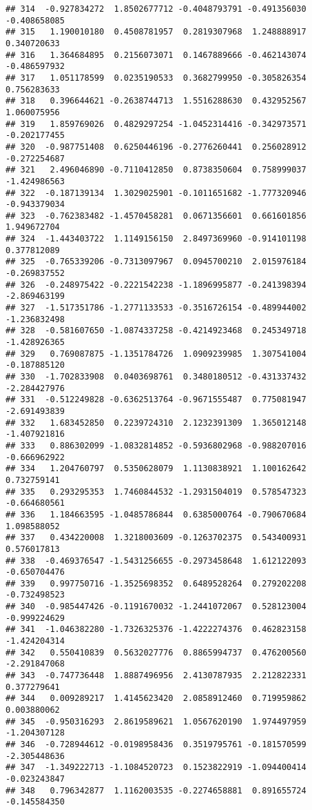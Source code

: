 \documentclass[
]{article}
\begin{document}
\begin{verbatim}
## 314  -0.927834272  1.8502677712 -0.4048793791 -0.491356030 -0.408658085
## 315   1.190010180  0.4508781957  0.2819307968  1.248888917  0.340720633
## 316   1.364684895  0.2156073071  0.1467889666 -0.462143074 -0.486597932
## 317   1.051178599  0.0235190533  0.3682799950 -0.305826354  0.756283633
## 318   0.396644621 -0.2638744713  1.5516288630  0.432952567  1.060075956
## 319   1.859769026  0.4829297254 -1.0452314416 -0.342973571 -0.202177455
## 320  -0.987751408  0.6250446196 -0.2776260441  0.256028912 -0.272254687
## 321   2.496046890 -0.7110412850  0.8738350604  0.758999037 -1.424986563
## 322  -0.187139134  1.3029025901 -0.1011651682 -1.777320946 -0.943379034
## 323  -0.762383482 -1.4570458281  0.0671356601  0.661601856  1.949672704
## 324  -1.443403722  1.1149156150  2.8497369960 -0.914101198  0.377812089
## 325  -0.765339206 -0.7313097967  0.0945700210  2.015976184 -0.269837552
## 326  -0.248975422 -0.2221542238 -1.1896995877 -0.241398394 -2.869463199
## 327  -1.517351786 -1.2771133533 -0.3516726154 -0.489944002 -1.236832498
## 328  -0.581607650 -1.0874337258 -0.4214923468  0.245349718 -1.428926365
## 329   0.769087875 -1.1351784726  1.0909239985  1.307541004 -0.187885120
## 330  -1.702833908  0.0403698761  0.3480180512 -0.431337432 -2.284427976
## 331  -0.512249828 -0.6362513764 -0.9671555487  0.775081947 -2.691493839
## 332   1.683452850  0.2239724310  2.1232391309  1.365012148 -1.407921816
## 333   0.886302099 -1.0832814852 -0.5936802968 -0.988207016 -0.666962922
## 334   1.204760797  0.5350628079  1.1130838921  1.100162642  0.732759141
## 335   0.293295353  1.7460844532 -1.2931504019  0.578547323 -0.664680561
## 336   1.184663595 -1.0485786844  0.6385000764 -0.790670684  1.098588052
## 337   0.434220008  1.3218003609 -0.1263702375  0.543400931  0.576017813
## 338  -0.469376547 -1.5431256655 -0.2973458648  1.612122093 -0.650704476
## 339   0.997750716 -1.3525698352  0.6489528264  0.279202208 -0.732498523
## 340  -0.985447426 -0.1191670032 -1.2441072067  0.528123004 -0.999224629
## 341  -1.046382280 -1.7326325376 -1.4222274376  0.462823158 -1.424204314
## 342   0.550410839  0.5632027776  0.8865994737  0.476200560 -2.291847068
## 343  -0.747736448  1.8887496956  2.4130787935  2.212822331  0.377279641
## 344   0.009289217  1.4145623420  2.0858912460  0.719959862  0.003880062
## 345  -0.950316293  2.8619589621  1.0567620190  1.974497959 -1.204307128
## 346  -0.728944612 -0.0198958436  0.3519795761 -0.181570599 -2.305448636
## 347  -1.349222713 -1.1084520723  0.1523822919 -1.094400414 -0.023243847
## 348   0.796342877  1.1162003535 -0.2274658881  0.891655724 -0.145584350

\end{verbatim}
\end{document}

